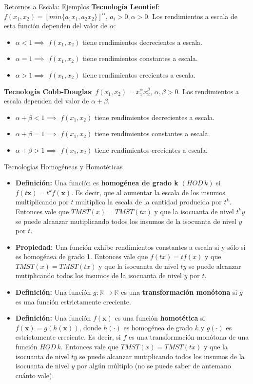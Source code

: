 \documentclass{beamer}
\theoremstyle{definition}
\begin{document}
\begin{frame}{Retornos a Escala: Ejemplos}
\textbf{Tecnolog\'ia Leontief}: $f(x_{1},x_{2})=[min\lbrace a_{1}x_{1},a_{2}x_{2}\rbrace]^{\alpha}$, $a_{i}>0,\alpha>0$. Los rendimientos a escala de esta funci\'on dependen del valor de $\alpha$:
\begin{itemize}
	\item $\alpha < 1 \implies$ $f(x_1,x_2)$ tiene rendimientos decrecientes a escala.
	\item $\alpha = 1 \implies$ $f(x_1,x_2)$ tiene rendimientos constantes a escala.
	\item $\alpha > 1 \implies$ $f(x_1,x_2)$ tiene rendimientos crecientes a escala.
\end{itemize}

\textbf{Tecnolog\'ia Cobb-Douglas}: $f(x_{1},x_{2})=x_{1}^{\alpha}x_{2}^{\beta}$, $\alpha,\beta>0$. Los rendimientos a escala dependen del valor de $\alpha+\beta$.
\begin{itemize}
	\item $\alpha+\beta < 1 \implies$ $f(x_1,x_2)$ tiene rendimientos decrecientes a escala.
	\item $\alpha+\beta  = 1 \implies$ $f(x_1,x_2)$ tiene rendimientos constantes a escala.
	\item $\alpha +\beta > 1 \implies$ $f(x_1,x_2)$ tiene rendimientos crecientes a escala.
\end{itemize}
\end{frame}

\begin{frame}{Tecnologías Homogéneas y Homotéticas}\small
\begin{itemize}[leftmargin=*]
	    \item \textbf{Definición:} Una función es \textbf{homogénea de grado k} $(HOD \,k)$ si $f(t\textbf{x})=t^{k}f(\textbf{x})$. Es decir, que al aumentar la escala de los insumos multiplicando por $t$ multiplica la escala de la cantidad producida por $t^k$. Entonces vale que $TMST(x)=TMST(tx)$ y que la isocuanta de nivel $t^ky$ se puede alcanzar mutiplicando todos los insumos de la isocuanta de nivel $y$ por $t$.
\item \textbf{Propiedad:} Una función exhibe rendimientos constantes a escala si y sólo si es homogénea de grado 1. Entonces vale que $f(tx)=tf(x)$ y que $TMST(x)=TMST(tx)$ y que la isocuanta de nivel $ty$ se puede alcanzar mutiplicando todos los insumos de la isocuanta de nivel $y$ por $t$.
\item \textbf{Definición:} Una función $g:\mathbb{R}\rightarrow\mathbb{R}$ es una \textbf{transformación monótona} si $g$ es una función estrictamente creciente.
\item \textbf{Definición:} Una función $f(\textbf{x})$ es una función \textbf{homotética} si $f(\textbf{x})=g(h(\textbf{x}))$, donde $h(\cdot)$ es homogénea de grado $k$ y $g(\cdot)$ es estrictamente creciente. Es decir, si $f$ es una transformación monótona de una función $HOD \,k$. Entonces vale que $TMST(x)=TMST(tx)$ y que la isocuanta de nivel $ty$ se puede alcanzar mutiplicando todos los insumos de la isocuanta de nivel $y$ por algún múltiplo (no se puede saber de antemano cuánto vale).	
\end{itemize}
\end{frame}
\end{document}
